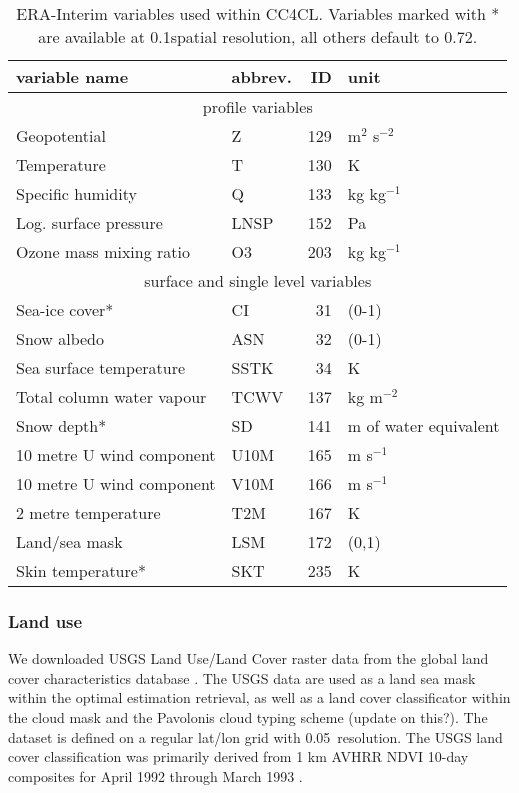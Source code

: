 \begin{table}[h]
  \caption{ERA-Interim variables used within CC4CL. Variables marked with * are available at 0.1\textdegree spatial resolution, all others default to 0.72\textdegree.}
  \begin{tabular}{p{3.8cm}|l|r|p{1.5cm}}
    \hline
    variable name & abbrev. & ID & unit \\
    \hline
    \multicolumn{4}{c}{profile variables} \\
    \hline
    Geopotential & Z & 129 & m$^2$ s$^{-2}$ \\
    Temperature  & T & 130 & K \\
    Specific humidity & Q & 133 & kg kg$^{-1}$ \\
    Log. surface pressure & LNSP & 152 & Pa \\
    Ozone mass mixing ratio & O3 & 203 & kg kg$^{-1}$ \\
    \hline
    \multicolumn{4}{c}{surface and single level variables} \\
    \hline
    Sea-ice cover* & CI & 31 & (0-1) \\
    Snow albedo & ASN & 32 & (0-1) \\
    Sea surface temperature & SSTK & 34 & K \\
    Total column water vapour & TCWV & 137 & kg m$^{-2}$ \\
    Snow depth* & SD & 141 & m of water equivalent \\
    10 metre U wind component & U10M & 165 & m s$^{-1}$ \\
    10 metre U wind component & V10M & 166 & m s$^{-1}$ \\
    2 metre temperature & T2M & 167 & K \\
    Land/sea mask & LSM & 172 & (0,1) \\
    Skin temperature* & SKT & 235 & K \\
    \hline
  \end{tabular}
  \label{tab:ERA-Interim}
\end{table}

\subsubsection{Land use}\label{sec:USGS}

We downloaded USGS Land Use/Land Cover raster data from the global land cover characteristics database \citep{USGS}. The USGS data are used as a land sea mask within the optimal estimation retrieval, as well as a land cover classificator within the cloud mask and the Pavolonis cloud typing scheme (update on this?). The dataset is defined on a regular lat/lon grid with 0.05\textdegree\ resolution. The USGS land cover classification was primarily derived from 1 km AVHRR NDVI 10-day composites for April 1992 through March 1993 \citep{USGS}. 


